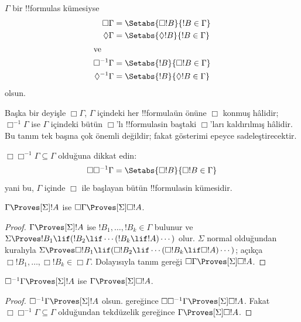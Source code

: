 \begin{defn}
  $\Gamma$ bir !!{formula}s kümesiyse
  \begin{align*}
    \Box\Gamma & = \Setabs{\Box !B}{!B \in \Gamma}\\
    \Diamond\Gamma & = \Setabs{\Diamond !B}{!B \in \Gamma}\\
    \intertext{ve}
    \Box^{-1}\Gamma & = \Setabs{!B}{\Box !B \in \Gamma}\\
    \Diamond^{-1}\Gamma & = \Setabs{!B}{\Diamond !B \in \Gamma}\\
  \end{align*}
  olsun.
\end{defn}

Başka bir deyişle $\Box\Gamma$, $\Gamma$ içindeki her !!{formula}{}ün önüne
$\Box$ konmuş hâlidir; $\Box^{-1}\Gamma$ ise $\Gamma$ içindeki bütün
$\Box$'lı !!{formula}s{}in baştaki $\Box$'ları kaldırılmış hâlidir. Bu tanım
tek başına çok önemli değildir; fakat gösterimi epeyce sadeleştirecektir.

$\Box\Box^{-1}\Gamma\subseteq\Gamma$ olduğuna dikkat edin:
\[
\Box\Box^{-1}\Gamma = \Setabs{\Box!B}{\Box!B \in \Gamma}
\]
yani bu, $\Gamma$ içinde $\Box$ ile başlayan bütün !!{formula}s{}in kümesidir.

\begin{lem}
  $\Gamma\Proves[\Sigma]!A$ ise
  $\Box\Gamma\Proves[\Sigma]\Box!A$.
\end{lem}

\begin{proof}
  $\Gamma\Proves[\Sigma]!A$ ise $!B_1,\dots,!B_k\in\Gamma$ bulunur ve
  $\Sigma\Proves !B_1\lif(!B_2\lif\cdots(!B_k\lif !A)\cdots)$ olur.
  $\Sigma$ normal olduğundan \RK{} kuralıyla
  $\Sigma\Proves\Box!B_1\lif(\Box!B_2\lif\cdots(\Box!B_k\lif
  \Box!A)\cdots)$; açıkça $\Box!B_1,\dots,\Box!B_k\in\Box\Gamma$.
  Dolayısıyla tanım gereği $\Box\Gamma\Proves[\Sigma]\Box!A$.
\end{proof}

\begin{lem}
  $\Box^{-1}\Gamma\Proves[\Sigma]!A$ ise
  $\Gamma\Proves[\Sigma]\Box!A$.
\end{lem}

\begin{proof}
  $\Box^{-1}\Gamma\Proves[\Sigma]!A$ olsun.  gereğince
  $\Box\Box^{-1}\Gamma\Proves[\Sigma]\Box!A$. Fakat
  $\Box\Box^{-1}\Gamma\subseteq\Gamma$ olduğundan tekdüzelik gereğince
  $\Gamma\Proves[\Sigma]\Box!A$.
\end{proof}

